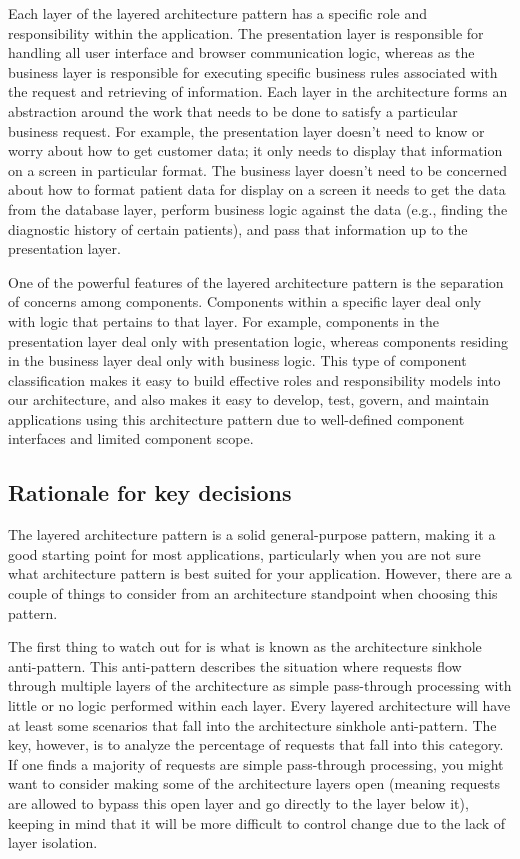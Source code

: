 \documentclass[10pt,oneside]{report}
\begin{document}
Each layer of the layered architecture pattern has a specific role and responsibility within the application. The presentation layer is responsible for handling all user interface and browser communication logic, whereas as the business layer is responsible for executing specific business rules associated with the request and retrieving of information. Each layer in the architecture forms an abstraction around the work that needs to be done to satisfy a particular business request. For example, the presentation layer doesn’t need to know or worry about how to get customer data; it only needs to display that information on a screen in particular format. The business layer doesn’t need to be concerned about how to format patient data for display on a screen it needs to get the data from the database layer, perform business logic against the data (e.g., finding the diagnostic history of certain patients), and pass that information up to the presentation layer. 

One of the powerful features of the layered architecture pattern is the separation of concerns among components. Components within a specific layer deal only with logic that pertains to that layer. For example, components in the presentation layer deal only with presentation logic, whereas components residing in the business layer deal only with business logic. This type of component classification makes it easy to build effective roles and responsibility models into our architecture, and also makes it easy to develop, test, govern, and maintain applications using this architecture pattern due to well-defined component interfaces and limited component scope. 

\subsection{Rationale for key decisions}

The layered architecture pattern is a solid general-purpose pattern, making it a good starting point for most applications, particularly when you are not sure what architecture pattern is best suited for your application. However, there are a couple of things to consider from an architecture standpoint when choosing this pattern.

The first thing to watch out for is what is known as the architecture sinkhole anti-pattern. This anti-pattern describes the situation where requests flow through multiple layers of the architecture as simple pass-through processing with little or no logic performed within each layer. Every layered architecture will have at least some scenarios that fall into the architecture sinkhole anti-pattern. The key, however, is to analyze the percentage of requests that fall into this category. If one finds a majority of requests are simple pass-through processing, you might want to consider making some of the architecture layers open (meaning requests are allowed to bypass this open layer and go directly to the layer below it), keeping in mind that it will be more difficult to control change due to the lack of layer isolation.
\end{document}
